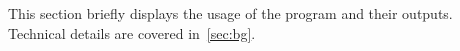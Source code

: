 This section briefly displays the usage of the program and their outputs.
Technical details are covered in~\cref{sec:bg}.

